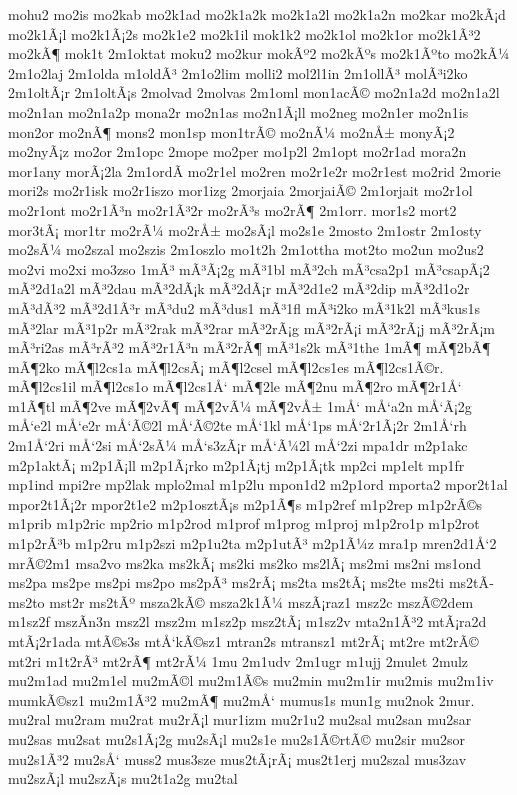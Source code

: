 {mohu2
mo2is
mo2kab
mo2k1ad
mo2k1a2k
mo2k1a2l
mo2k1a2n
mo2kar
mo2kÃ¡d
mo2k1Ã¡l
mo2k1Ã¡2s
mo2k1e2
mo2k1il
mok1k2
mo2k1ol
mo2k1or
mo2k1Ã³2
mo2kÃ¶
mok1t
2m1oktat
moku2
mo2kur
mokÃº2
mo2kÃºs
mo2k1Ãºto
mo2kÃ¼
2m1o2laj
2m1olda
m1oldÃ³
2m1o2lim
molli2
mol2l1in
2m1ollÃ³
molÃ³i2ko
2m1oltÃ¡r
2m1oltÃ¡s
2molvad
2molvas
2m1oml
mon1acÃ©
mo2n1a2d
mo2n1a2l
mo2n1an
mo2n1a2p
mona2r
mo2n1as
mo2n1Ã¡ll
mo2neg
mo2n1er
mo2n1is
mon2or
mo2nÃ¶
mons2
mon1sp
mon1trÃ©
mo2nÃ¼
mo2nÅ±
monyÃ¡2
mo2nyÃ¡z
mo2or
2m1opc
2mope
mo2per
mo1p2l
2m1opt
mo2r1ad
mora2n
mor1any
morÃ¡2la
2m1ordÃ­
mo2r1el
mo2ren
mo2r1e2r
mo2r1est
mo2rid
2morie
mori2s
mo2r1isk
mo2r1iszo
mor1izg
2morjaia
2morjaiÃ©
2m1orjait
mo2r1ol
mo2r1ont
mo2r1Ã³n
mo2r1Ã³2r
mo2rÃ³s
mo2rÃ¶
2m1orr.
mor1s2
mort2
mor3tÃ¡
mor1tr
mo2rÃ¼
mo2rÅ±
mo2sÃ¡l
mo2s1e
2mosto
2m1ostr
2m1osty
mo2sÃ¼
mo2szal
mo2szis
2m1oszlo
mo1t2h
2m1ottha
mot2to
mo2un
mo2us2
mo2vi
mo2xi
mo3zso
1mÃ³
mÃ³Ã¡2g
mÃ³1bl
mÃ³2ch
mÃ³csa2p1
mÃ³csapÃ¡2
mÃ³2d1a2l
mÃ³2dau
mÃ³2dÃ¡k
mÃ³2dÃ¡r
mÃ³2d1e2
mÃ³2dip
mÃ³2d1o2r
mÃ³dÃ³2
mÃ³2d1Ã³r
mÃ³du2
mÃ³dus1
mÃ³1fl
mÃ³i2ko
mÃ³1k2l
mÃ³kus1s
mÃ³2lar
mÃ³1p2r
mÃ³2rak
mÃ³2rar
mÃ³2rÃ¡g
mÃ³2rÃ¡i
mÃ³2rÃ¡j
mÃ³2rÃ¡m
mÃ³ri2as
mÃ³rÃ³2
mÃ³2r1Ã³n
mÃ³2rÃ¶
mÃ³1s2k
mÃ³1the
1mÃ¶
mÃ¶2bÃ¶
mÃ¶2ko
mÃ¶l2cs1a
mÃ¶l2csÃ¡
mÃ¶l2csel
mÃ¶l2cs1es
mÃ¶l2cs1Ã©r.
mÃ¶l2cs1il
mÃ¶l2cs1o
mÃ¶l2cs1Å‘
mÃ¶2le
mÃ¶2nu
mÃ¶2ro
mÃ¶2r1Å‘
m1Ã¶tl
mÃ¶2ve
mÃ¶2vÃ¶
mÃ¶2vÃ¼
mÃ¶2vÅ±
1mÅ‘
mÅ‘a2n
mÅ‘Ã¡2g
mÅ‘e2l
mÅ‘e2r
mÅ‘Ã©2l
mÅ‘Ã©2te
mÅ‘1kl
mÅ‘1ps
mÅ‘2r1Ã¡2r
2m1Å‘rh
2m1Å‘2ri
mÅ‘2si
mÅ‘2sÃ¼
mÅ‘s3zÃ¡r
mÅ‘Ã¼2l
mÅ‘2zi
mpa1dr
m2p1akc
m2p1aktÃ¡
m2p1Ã¡ll
m2p1Ã¡rko
m2p1Ã¡tj
m2p1Ã¡tk
mp2ci
mp1elt
mp1fr
mp1ind
mpi2re
mp2lak
mplo2mal
m1p2lu
mpon1d2
m2p1ord
mporta2
mpor2t1al
mpor2t1Ã¡2r
mpor2t1e2
m2p1osztÃ¡s
m2p1Ã¶s
m1p2ref
m1p2rep
m1p2rÃ©s
m1prib
m1p2ric
mp2rio
m1p2rod
m1prof
m1prog
m1proj
m1p2ro1p
m1p2rot
m1p2rÃ³b
m1p2ru
m1p2szi
m2p1u2ta
m2p1utÃ³
m2p1Ã¼z
mra1p
mren2d1Å‘2
mrÃ©2m1
msa2vo
ms2ka
ms2kÃ¡
ms2ki
ms2ko
ms2lÃ¡
ms2mi
ms2ni
ms1ond
ms2pa
ms2pe
ms2pi
ms2po
ms2pÃ³
ms2rÃ¡
ms2ta
ms2tÃ¡
ms2te
ms2ti
ms2tÃ­
ms2to
mst2r
ms2tÃº
msza2kÃ©
msza2k1Ã¼
mszÃ¡raz1
msz2c
mszÃ©2dem
m1sz2f
mszÃ­n3n
msz2l
msz2m
m1sz2p
msz2tÃ¡
m1sz2v
mta2n1Ã³2
mtÃ¡ra2d
mtÃ¡2r1ada
mtÃ©s3s
mtÅ‘kÃ©sz1
mtran2s
mtransz1
mt2rÃ¡
mt2re
mt2rÃ©
mt2ri
m1t2rÃ³
mt2rÃ¶
mt2rÃ¼
1mu
2m1udv
2m1ugr
m1ujj
2mulet
2mulz
mu2m1ad
mu2m1el
mu2mÃ©l
mu2m1Ã©s
mu2min
mu2m1ir
mu2mis
mu2m1iv
mumkÃ©sz1
mu2m1Ã³2
mu2mÃ¶
mu2mÅ‘
mumus1s
mun1g
mu2nok
2mur.
mu2ral
mu2ram
mu2rat
mu2rÃ¡l
mur1izm
mu2r1u2
mu2sal
mu2san
mu2sar
mu2sas
mu2sat
mu2s1Ã¡2g
mu2sÃ¡l
mu2s1e
mu2s1Ã©rtÃ©
mu2sir
mu2sor
mu2s1Ã³2
mu2sÅ‘
muss2
mus3sze
mus2tÃ¡rÃ¡
mus2t1erj
mu2szal
mus3zav
mu2szÃ¡l
mu2szÃ¡s
mu2t1a2g
mu2tal
}
